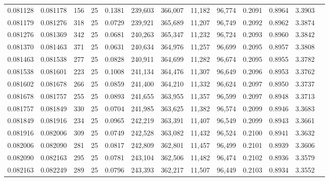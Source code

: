 \begin{tabular}{rrrrrrrrrrrrr}
0.081128 & 0.081178 &   156 &  25 &                                     0.1381 & 239,603 & 366,007 &  11,182 &  96,774 & 0.2091 & 0.8964 & 3.3903 \\
0.081179 & 0.081276 &   318 &  25 &                                     0.0729 & 239,921 & 365,689 &  11,207 &  96,749 & 0.2092 & 0.8962 & 3.3874 \\
0.081276 & 0.081369 &   342 &  25 &                                     0.0681 & 240,263 & 365,347 &  11,232 &  96,724 & 0.2093 & 0.8960 & 3.3842 \\
0.081370 & 0.081463 &   371 &  25 &                                     0.0631 & 240,634 & 364,976 &  11,257 &  96,699 & 0.2095 & 0.8957 & 3.3808 \\
0.081463 & 0.081538 &   277 &  25 &                                     0.0828 & 240,911 & 364,699 &  11,282 &  96,674 & 0.2095 & 0.8955 & 3.3782 \\
0.081538 & 0.081601 &   223 &  25 &                                     0.1008 & 241,134 & 364,476 &  11,307 &  96,649 & 0.2096 & 0.8953 & 3.3762 \\
0.081602 & 0.081678 &   266 &  25 &                                     0.0859 & 241,400 & 364,210 &  11,332 &  96,624 & 0.2097 & 0.8950 & 3.3737 \\
0.081678 & 0.081757 &   255 &  25 &                                     0.0893 & 241,655 & 363,955 &  11,357 &  96,599 & 0.2097 & 0.8948 & 3.3713 \\
0.081757 & 0.081849 &   330 &  25 &                                     0.0704 & 241,985 & 363,625 &  11,382 &  96,574 & 0.2099 & 0.8946 & 3.3683 \\
0.081849 & 0.081916 &   234 &  25 &                                     0.0965 & 242,219 & 363,391 &  11,407 &  96,549 & 0.2099 & 0.8943 & 3.3661 \\
0.081916 & 0.082006 &   309 &  25 &                                     0.0749 & 242,528 & 363,082 &  11,432 &  96,524 & 0.2100 & 0.8941 & 3.3632 \\
0.082006 & 0.082090 &   281 &  25 &                                     0.0817 & 242,809 & 362,801 &  11,457 &  96,499 & 0.2101 & 0.8939 & 3.3606 \\
0.082090 & 0.082163 &   295 &  25 &                                     0.0781 & 243,104 & 362,506 &  11,482 &  96,474 & 0.2102 & 0.8936 & 3.3579 \\
0.082163 & 0.082249 &   289 &  25 &                                     0.0796 & 243,393 & 362,217 &  11,507 &  96,449 & 0.2103 & 0.8934 & 3.3552 \\

\end{tabular}
